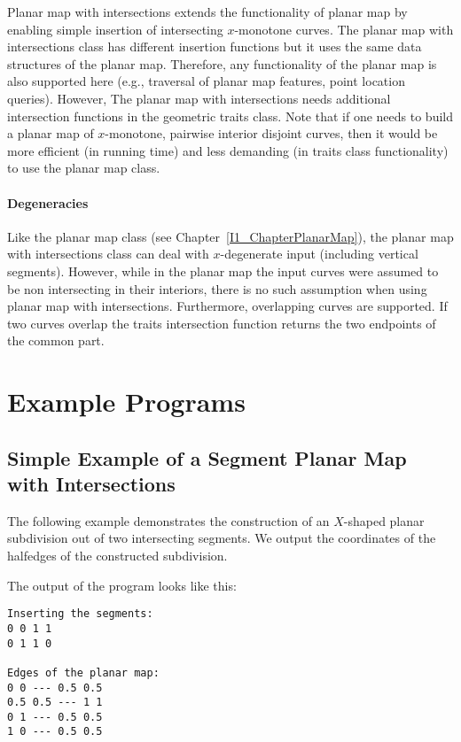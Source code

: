 Planar map with intersections extends the functionality of planar
map by enabling simple insertion of intersecting $x$-monotone
curves. The planar map with intersections class has different
insertion functions but it uses the same data structures of the
planar map. Therefore, any functionality of the planar map is also
supported here (e.g., traversal of planar map features, point
location queries). However, The planar map with intersections
needs additional intersection functions in the geometric traits
class. Note that if one needs to build a planar map of
$x$-monotone, pairwise interior disjoint curves, then it would be
more efficient (in running time) and less demanding (in traits
class functionality) to use the planar map class.


\paragraph{Degeneracies} Like the planar map class (see
Chapter~\ref{I1_ChapterPlanarMap}), the planar map with intersections class can deal with
$x$-degenerate input (including vertical segments). However, while in the
planar map the input curves were assumed to be non
intersecting in their interiors, there is no such assumption when using
planar map with intersections. Furthermore, overlapping curves are
supported. If two curves overlap the traits intersection function returns
the two endpoints of the common part.






\section{Example Programs}
\subsection{Simple Example of a Segment Planar Map with Intersections}
\label{ssec:example1}
The following example demonstrates the construction of an
$X$-shaped planar subdivision out of two intersecting segments.
We output the coordinates of the halfedges of the constructed
subdivision.


The output of the program looks like this:
\begin{verbatim}
Inserting the segments:
0 0 1 1
0 1 1 0

Edges of the planar map:
0 0 --- 0.5 0.5
0.5 0.5 --- 1 1
0 1 --- 0.5 0.5
1 0 --- 0.5 0.5
\end{verbatim}




